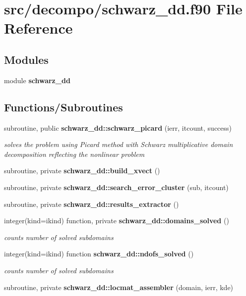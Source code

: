 \section{src/decompo/schwarz\+\_\+dd.f90 File Reference}
\label{schwarz__dd_8f90}
\subsection*{Modules}
\begin{DoxyCompactItemize}
\item 
module {\bf schwarz\+\_\+dd}
\end{DoxyCompactItemize}
\subsection*{Functions/\+Subroutines}
\begin{DoxyCompactItemize}
\item 
subroutine, public {\bf schwarz\+\_\+dd\+::schwarz\+\_\+picard} (ierr, itcount, success)
\begin{DoxyCompactList}\small\item\em solves the problem using Picard method with Schwarz multiplicative domain decomposition reflecting the nonlinear problem \end{DoxyCompactList}\item 
subroutine, private {\bf schwarz\+\_\+dd\+::build\+\_\+xvect} ()
\item 
subroutine, private {\bf schwarz\+\_\+dd\+::search\+\_\+error\+\_\+cluster} (sub, itcount)
\item 
subroutine, private {\bf schwarz\+\_\+dd\+::results\+\_\+extractor} ()
\item 
integer(kind=ikind) function, private {\bf schwarz\+\_\+dd\+::domains\+\_\+solved} ()
\begin{DoxyCompactList}\small\item\em counts number of solved subdomains \end{DoxyCompactList}\item 
integer(kind=ikind) function {\bf schwarz\+\_\+dd\+::ndofs\+\_\+solved} ()
\begin{DoxyCompactList}\small\item\em counts number of solved subdomains \end{DoxyCompactList}\item 
subroutine, private {\bf schwarz\+\_\+dd\+::locmat\+\_\+assembler} (domain, ierr, kde)
\end{DoxyCompactItemize}
